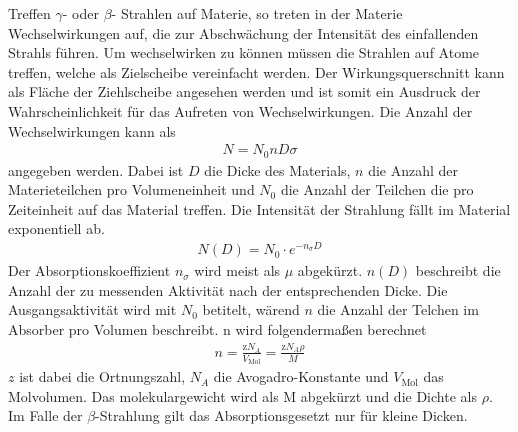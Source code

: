Treffen $\gamma$- oder $\beta$- Strahlen auf Materie, so treten in der Materie Wechselwirkungen auf, die zur Abschwächung der Intensität des einfallenden Strahls führen.
Um wechselwirken zu können müssen die Strahlen auf Atome treffen, welche als Zielscheibe vereinfacht werden. Der Wirkungsquerschnitt kann als Fläche der Ziehlscheibe angesehen werden und ist somit ein Ausdruck der Wahrscheinlichkeit für das Aufreten von Wechselwirkungen.
Die Anzahl der Wechselwirkungen kann als
\begin{align*}
  N=N_0nD\sigma
\end{align*}
angegeben werden. Dabei ist $D$ die Dicke des Materials, $n$ die Anzahl der Materieteilchen pro Volumeneinheit und $N_0$ die Anzahl der Teilchen die pro Zeiteinheit auf das Material treffen.
Die Intensität der Strahlung fällt im Material exponentiell ab.
\begin{align}
  N(D)=N_0\cdot e^{-n_\sigma D}
  \label{eqn:e}
\end{align}
Der Absorptionskoeffizient $n_\sigma$ wird meist als $\mu$ abgekürzt. $n(D)$ beschreibt die Anzahl der zu messenden Aktivität nach der entsprechenden Dicke. Die Ausgangsaktivität wird mit $N_0$ betitelt, wärend $n$ die Anzahl der Telchen im Absorber pro Volumen beschreibt.
n wird folgendermaßen berechnet
\begin{align*}
  n=\frac{\text{z}N_A}{V_{\text{Mol}}}=\frac{\text{z}N_A\rho}{M}
\end{align*}
$z$ ist dabei die Ortnungszahl, $N_A$ die Avogadro-Konstante und $V_\text{Mol}$ das Molvolumen. Das molekulargewicht wird als M abgekürzt und die Dichte als $\rho$.
Im Falle der $\beta$-Strahlung gilt das Absorptionsgesetzt nur für kleine Dicken.
